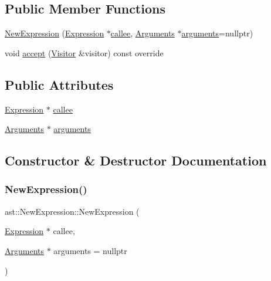 \subsection*{Public Member Functions}
\begin{DoxyCompactItemize}
\item 
\hyperlink{structast_1_1_new_expression_ab2dadb963fcfd92dbf51ed98c0d2052c}{New\+Expression} (\hyperlink{structast_1_1_expression}{Expression} $\ast$\hyperlink{structast_1_1_new_expression_a16da596cbcdc3de139f74dffd2611993}{callee}, \hyperlink{structast_1_1_arguments}{Arguments} $\ast$\hyperlink{structast_1_1_new_expression_a9ef033d5f7aed8595bb4e97f8d955b57}{arguments}=nullptr)
\item 
void \hyperlink{structast_1_1_new_expression_a2bbbe32ce252983e8e67f228790751f7}{accept} (\hyperlink{structast_1_1_visitor}{Visitor} \&visitor) const override
\end{DoxyCompactItemize}
\subsection*{Public Attributes}
\begin{DoxyCompactItemize}
\item 
\hyperlink{structast_1_1_expression}{Expression} $\ast$ \hyperlink{structast_1_1_new_expression_a16da596cbcdc3de139f74dffd2611993}{callee}
\item 
\hyperlink{structast_1_1_arguments}{Arguments} $\ast$ \hyperlink{structast_1_1_new_expression_a9ef033d5f7aed8595bb4e97f8d955b57}{arguments}
\end{DoxyCompactItemize}


\subsection{Constructor \& Destructor Documentation}
\mbox{\label{structast_1_1_new_expression_ab2dadb963fcfd92dbf51ed98c0d2052c}} 
\subsubsection{\texorpdfstring{New\+Expression()}{NewExpression()}}
{\footnotesize\ttfamily ast\+::\+New\+Expression\+::\+New\+Expression (\begin{DoxyParamCaption}\item[{\hyperlink{structast_1_1_expression}{Expression} $\ast$}]{callee,  }\item[{\hyperlink{structast_1_1_arguments}{Arguments} $\ast$}]{arguments = {\ttfamily nullptr} }\end{DoxyParamCaption})\hspace{0.3cm}{\ttfamily [inline]}}



